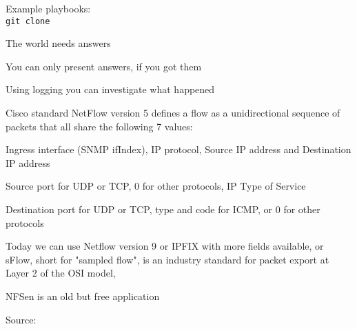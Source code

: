 \documentclass[Screen16to9,17pt]{foils}
\begin{document}
Example playbooks:\\
\verb+git clone +






\begin{list2}
\item The world needs answers
\item You can only present answers, if you got them

\item Using logging you can investigate what happened
\end{list2}





\begin{slidelist}
\item Cisco standard NetFlow version 5 defines a flow as a unidirectional sequence of packets that all share the following 7 values:
\begin{list2}
\item Ingress interface (SNMP ifIndex), IP protocol, Source IP address and Destination IP address
\item Source port for UDP or TCP, 0 for other protocols, IP Type of Service
\item Destination port for UDP or TCP, type and code for ICMP, or 0 for other protocols
\end{list2}
\item Today we can use Netflow version 9 or IPFIX with more fields available, or  sFlow, short for "sampled flow", is an industry standard for packet export at Layer 2 of the OSI model, \\
\item NFSen is an old but free application
\end{slidelist}

Source: \\{\footnotesize
{}\\
}


\end{document}
